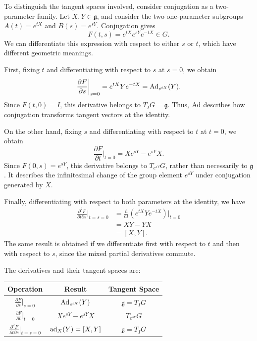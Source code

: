 \documentclass[../main.tex]{subfiles}
\begin{document}
\begin{remark}
  To distinguish the tangent spaces involved, consider conjugation as a two-parameter family. Let $X,Y\in\mathfrak{g}$, and consider the two one-parameter subgroups $A(t)=e^{tX}$ and $B(s)=e^{sY}$. Conjugation gives
  \begin{equation}
    F(t,s)=e^{tX}e^{sY}e^{-tX}\in G.
  \end{equation}
  We can differentiate this expression with respect to either $s$ or $t$, which have different geometric meanings.

  First, fixing $t$ and differentiating with respect to $s$ at $s=0$, we obtain
  \begin{equation}
    \frac{\partial F}{\partial s}\bigg|_{s=0}
    =e^{tX}Ye^{-tX}
    =\operatorname{Ad}_{e^{tX}}(Y).
  \end{equation}
  Since $F(t,0)=I$, this derivative belongs to $T_I G=\mathfrak{g}$. Thus, $\operatorname{Ad}$ describes how conjugation transforms tangent vectors at the identity.

  On the other hand, fixing $s$ and differentiating with respect to $t$ at $t=0$, we obtain
  \begin{equation}
    \frac{\partial F}{\partial t}\bigg|_{t=0}
    =Xe^{sY}-e^{sY}X.
  \end{equation}
  Since $F(0,s)=e^{sY}$, this derivative belongs to $T_{e^{sY}}G$, rather than necessarily to $\mathfrak{g}$. It describes the infinitesimal change of the group element $e^{sY}$ under conjugation generated by $X$.

  Finally, differentiating with respect to both parameters at the identity, we have
  \begin{equation}
    \begin{aligned}
      \frac{\partial^2 F}{\partial t\partial s}\bigg|_{t=s=0}
      &=\frac{\mathrm{d}}{\mathrm{d}t}
      \left(e^{tX}Ye^{-tX}\right)\bigg|_{t=0}\\
      &=XY-YX\\
      &=[X,Y].
    \end{aligned}
  \end{equation}
  The same result is obtained if we differentiate first with respect to $t$ and then with respect to $s$, since the mixed partial derivatives commute.

  The derivatives and their tangent spaces are:
  \begin{center}
    \renewcommand{\arraystretch}{1.5}
    \begin{tabular}{|c|c|c|}
      \hline
      \textbf{Operation} & \textbf{Result} & \textbf{Tangent Space}\\
      \hline
      $\displaystyle\frac{\partial F}{\partial s}\bigg|_{s=0}$
      & $\operatorname{Ad}_{e^{tX}}(Y)$
      & $\mathfrak{g}=T_I G$\\
      \hline
      $\displaystyle\frac{\partial F}{\partial t}\bigg|_{t=0}$
      & $Xe^{sY}-e^{sY}X$
      & $T_{e^{sY}}G$\\
      \hline
      $\displaystyle\frac{\partial^2 F}{\partial t\partial s}\bigg|_{t=s=0}$
      & $\operatorname{ad}_X(Y)=[X,Y]$
      & $\mathfrak{g}=T_I G$\\
      \hline
    \end{tabular}
  \end{center}


\end{remark}
\end{document}
